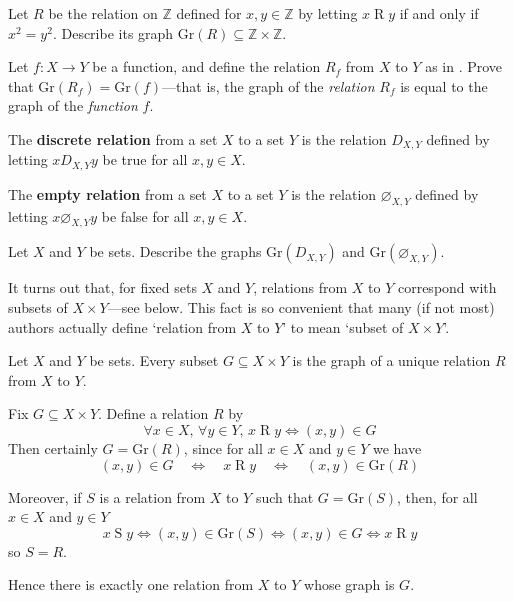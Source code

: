 \begin{exercise}
Let $R$ be the relation on $\mathbb{Z}$ defined for $x,y \in \mathbb{Z}$ by letting $x \mathrel{R} y$ if and only if $x^2=y^2$. Describe its graph $\mathrm{Gr}(R) \subseteq \mathbb{Z} \times \mathbb{Z}$.
\end{exercise}

\begin{exercise}
Let $f : X \to Y$ be a function, and define the relation $R_f$ from $X$ to $Y$ as in . Prove that $\mathrm{Gr}(R_f) = \mathrm{Gr}(f)$---that is, the graph of the \textit{relation} $R_f$ is equal to the graph of the \textit{function} $f$.
\end{exercise}

\begin{definition}
\label{defEmptyRelation}
\label{defDiscreteRelation}
The \textbf{discrete relation} from a set $X$ to a set $Y$ is the relation $D_{X,Y}$ defined by letting $x \mathrel{D_{X,Y}} y$ be true for all $x,y \in X$.

The \textbf{empty relation} from a set $X$ to a set $Y$ is the relation $\varnothing_{X,Y}$  defined by letting $x \mathrel{\varnothing_{X,Y}} y$ be false for all $x,y \in X$.
\end{definition}

\begin{exercise}
\label{exGraphOfEmptyAndDiscreteRelations}
Let $X$ and $Y$ be sets. Describe the graphs $\mathrm{Gr}(D_{X,Y})$ and $\mathrm{Gr}(\varnothing_{X,Y})$.
\end{exercise}

It turns out that, for fixed sets $X$ and $Y$, relations from $X$ to $Y$ correspond with subsets of $X \times Y$---see  below. This fact is so convenient that many (if not most) authors actually define `relation from $X$ to $Y$' to mean `subset of $X \times Y$'.

\begin{theorem}
\label{thmRelationsAsSubsets}
Let $X$ and $Y$ be sets. Every subset $G \subseteq X \times Y$ is the graph of a unique relation $R$ from $X$ to $Y$.
\end{theorem}
\begin{cproof}
Fix $G \subseteq X \times Y$. Define a relation $R$ by
\[ \forall x \in X,\, \forall y \in Y,\, x \mathbin{R} y \Leftrightarrow (x,y) \in G \]
Then certainly $G = \mathrm{Gr}(R)$, since for all $x \in X$ and $y \in Y$ we have
\[ (x,y) \in G \quad \Leftrightarrow \quad x \mathrel{R} y \quad \Leftrightarrow \quad (x,y) \in \mathrm{Gr}(R) \]

Moreover, if $S$ is a relation from $X$ to $Y$ such that $G=\mathrm{Gr}(S)$, then, for all $x \in X$ and $y \in Y$ 
\[ x \mathrel{S} y \Leftrightarrow (x,y) \in \mathrm{Gr}(S) \Leftrightarrow (x,y) \in G \Leftrightarrow x \mathrel{R} y \]
so $S=R$.

Hence there is exactly one relation from $X$ to $Y$ whose graph is $G$.
\end{cproof}

